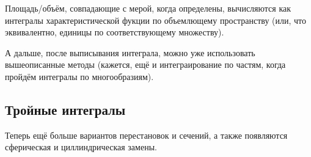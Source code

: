 \documentclass[12pt, a4paper]{article}
\begin{document}
Площадь/объём, совпадающие с мерой, когда определены,
вычисляются как интегралы характеристической фукции по объемлющему пространству
(или, что эквивалентно, единицы по соответствующему множеству).

А дальше, после выписывания интеграла, можно уже использовать вышеописанные методы (кажется, ещё и интеграирование по частям, когда пройдём интегралы по многообразиям).


\subsection{Тройные интегралы}

Теперь ещё больше вариантов перестановок и сечений,
а также появляются сферическая и циллиндрическая замены. 
\end{document}
